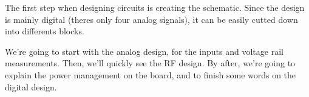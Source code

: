 The first step when designing circuits is creating the schematic.
Since the design is mainly digital (theres only four analog signals), it
can be easily cutted down into differents blocks.

We're going to start with the analog design, for the inputs and voltage
rail measurements. Then, we'll quickly see the RF design. By after, we're
going to explain the power management on the board, and to finish some words
on the digital design.